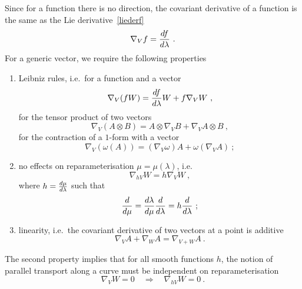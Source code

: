     Since for a function there is no direction, the covariant derivative of a function is the same as the Lie derivative~\ref{liederf}
    \begin{equation*}
        \nabla_V f = \frac{df}{d\lambda} ~.
    \end{equation*}
    For a generic vector, we require the following properties
    \begin{enumerate}
        \item Leibniz rules, i.e.~for a function and a vector
            \begin{equation}\label{covlei}
                \nabla_V (f W) = \frac{df}{d\lambda} W + f \nabla_V W ~,
            \end{equation}
                for the tensor product of two vectors
            \begin{equation*}
                \nabla_V (A \otimes B) = A \otimes \nabla_V B + \nabla_V A \otimes B ~,
            \end{equation*}
                for the contraction of a $1$-form with a vector
            \begin{equation*}
                \nabla_V (\omega (A)) = (\nabla_V \omega) A + \omega (\nabla_V A) ~;
            \end{equation*}
        \item no effects on reparameterisation $\mu = \mu(\lambda)$, i.e. 
             \begin{equation}\label{covre}
                \nabla_{h V} W = h \nabla_V W ~,
            \end{equation}
            where $h = \frac{d\mu}{d\lambda}$ such that 
            \begin{equation*}
                \frac{d}{d\mu} = \frac{d\lambda}{d\mu} \frac{d}{d\lambda} = h \frac{d}{d\lambda} ~;
            \end{equation*}
        \item linearity, i.e.~the covariant derivative of two vectors at a point is additive
            \begin{equation*}
                \nabla_V A + \nabla_W A = \nabla_{V + W} A ~.
            \end{equation*} 
    \end{enumerate}
    The second property implies that for all smooth functions $h$, the notion of parallel transport along a curve must be independent on reparameterisation
    \begin{equation*}
        \nabla_V W = 0 \quad \Rightarrow \quad \nabla_{hV} W = 0 ~.
    \end{equation*}
